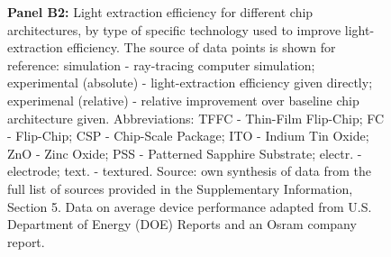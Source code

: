 \documentclass[twoside,twocolumn,9pt]{article}
\begin{document}
\begin{figure}[h!]
{ \textbf{Panel B2:} Light extraction efficiency for different chip architectures, by type of specific technology used to improve light-extraction efficiency. The source of data points is shown for reference: simulation - ray-tracing computer simulation; experimental (absolute) - light-extraction efficiency given directly; experimenal (relative) - relative improvement over baseline chip architecture given. Abbreviations: TFFC - Thin-Film Flip-Chip; FC - Flip-Chip; CSP - Chip-Scale Package; ITO - Indium Tin Oxide; ZnO - Zinc Oxide; PSS - Patterned Sapphire Substrate; electr. - electrode; text. - textured.
 Source: own synthesis of data from the full list of sources provided in the Supplementary Information, Section 5. Data on average device performance adapted from U.S. Department of Energy (DOE) Reports\cite{doe_ssl_multiyear_2007}\cite{doe_ssl_multiyear_2008}\cite{doe_ssl_multiyear_2013}\cite{doe_ssl_rnd_2016}\cite{doe_ssl_rnd_2018} and an Osram company report\cite{beale_leds_2015}.}
 \label{fgr:subeff}
\end{figure}
\end{document}

